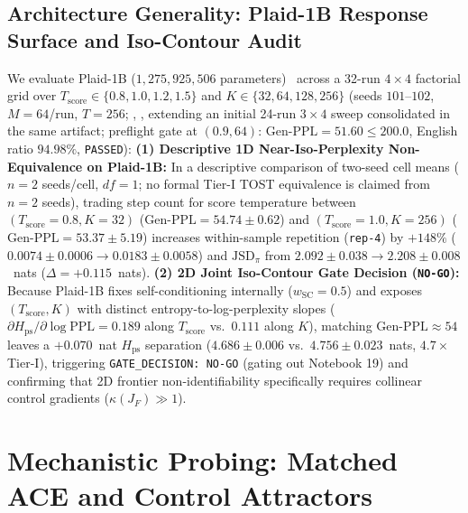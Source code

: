 \documentclass[11pt,a4paper]{article}
\begin{document}
\subsection{Architecture Generality: Plaid-1B Response Surface and Iso-Contour Audit}
We evaluate Plaid-1B ($1{,}275{,}925{,}506$ parameters)~\citep{gulrajani2023plaid} across a 32-run $4\times 4$ factorial grid over $T_{\mathrm{score}} \in \{0.8, 1.0, 1.2, 1.5\}$ and $K \in \{32, 64, 128, 256\}$ (seeds $101\text{--}102$, $M=64$/run, $T=256$; , , extending an initial 24-run $3\times 4$ sweep consolidated in the same artifact; preflight gate at $(0.9, 64)$: $\text{Gen-PPL}=51.60 \le 200.0$, English ratio $94.98\%$, \texttt{PASSED}):
\textbf{(1) Descriptive 1D Near-Iso-Perplexity Non-Equivalence on Plaid-1B:} In a descriptive comparison of two-seed cell means ($n=2$ seeds/cell, $df=1$; no formal Tier-I TOST equivalence is claimed from $n=2$ seeds), trading step count for score temperature between $(T_{\mathrm{score}}=0.8, K=32)$ ($\text{Gen-PPL} = 54.74\pm 0.62$) and $(T_{\mathrm{score}}=1.0, K=256)$ ($\text{Gen-PPL} = 53.37\pm 5.19$) increases within-sample repetition (\texttt{rep-4}) by $+148\%$ ($0.0074\pm 0.0006 \to 0.0183\pm 0.0058$) and $\mathrm{JSD}_\pi$ from $2.092\pm 0.038 \to 2.208\pm 0.008$~nats ($\Delta = +0.115$~nats).
\textbf{(2) 2D Joint Iso-Contour Gate Decision (\texttt{NO-GO}):} Because Plaid-1B fixes self-conditioning internally ($w_{\mathrm{SC}}=0.5$) and exposes $(T_{\mathrm{score}}, K)$ with distinct entropy-to-log-perplexity slopes ($\partial H_{\mathrm{ps}}/\partial\log\text{PPL} = 0.189$ along $T_{\mathrm{score}}$ vs.\ $0.111$ along $K$), matching $\text{Gen-PPL} \approx 54$ leaves a $+0.070$~nat $H_{\mathrm{ps}}$ separation ($4.686\pm 0.006$ vs.\ $4.756\pm 0.023$~nats, $4.7\times$ Tier-I), triggering \texttt{GATE\_DECISION: NO-GO} (gating out Notebook 19) and confirming that 2D frontier non-identifiability specifically requires collinear control gradients ($\kappa(J_F) \gg 1$).

\section{Mechanistic Probing: Matched ACE and Control Attractors}
\label{sec:ace}
\end{document}
